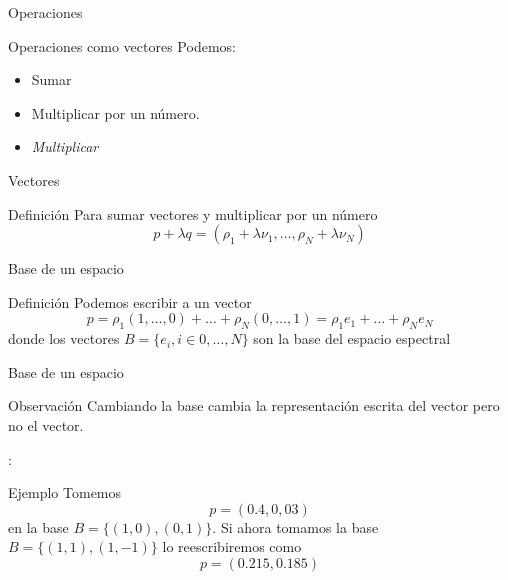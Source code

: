 \documentclass[handout]{beamer}
\begin{document}
\begin{frame}{Operaciones}
  \begin{block}{Operaciones como vectores}
    Podemos:
    \begin{itemize}[<+->]
      \item Sumar
      \item Multiplicar por un número.
      \item \emph{Multiplicar}
    \end{itemize}
  \end{block}
\end{frame}

\begin{frame}{Vectores}
  \begin{block}{Definición}
    Para sumar vectores y multiplicar por un número
    \begin{equation}
      p + \lambda q = (\rho_1+ \lambda \nu_1, \ldots ,\rho_N+\lambda \nu_N)
    \end{equation}
  \end{block}
\end{frame}

\begin{frame}{Base de un espacio}
  \begin{block}{Definición}
    Podemos escribir a un vector
    \begin{equation}
      p = \rho_1 (1,\ldots,0) + \ldots + \rho_N (0,\ldots,1) = \rho_1 e_1 + \ldots + \rho_N e_N
    \end{equation}
    donde los vectores $B = \{e_i, i \in 0, \ldots, N \}$ son la base del espacio espectral
  \end{block}
\end{frame}
\begin{frame}{Base de un espacio}
  \begin{block}{Observación}
    Cambiando la base cambia la representación escrita del vector pero no el vector.
  \end{block}:
  \begin{exampleblock}{Ejemplo}
    Tomemos
    \begin{equation}
      p = (0.4, 0,03)
    \end{equation} en la base $B = \{ (1,0), (0,1)\}$. \pause
    Si ahora tomamos la base $B = \{ (1,1), (1,-1)\}$ lo reescribiremos como
    \begin{equation}
      p = (0.215, 0.185)
    \end{equation}
  \end{exampleblock}
\end{frame}
\end{document}
